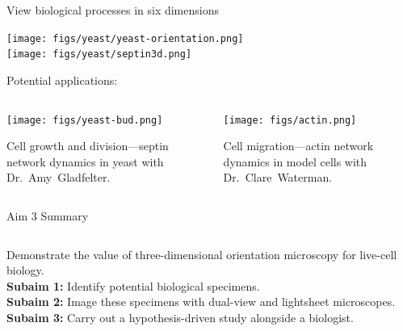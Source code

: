 \documentclass[presentation]{beamer}
\begin{document}
\begin{frame}{View biological processes in six dimensions}
  \begin{center}
    \texttt{[image: figs/yeast/yeast-orientation.png]}\\
    \texttt{[image: figs/yeast/septin3d.png]}
 \end{center}
\end{frame}

\begin{frame}{Potential applications:}
  \begin{columns}
    \begin{column}{0.5\textwidth}
      \begin{center}
      \texttt{[image: figs/yeast-bud.png]}\\  
      \end{center}
      Cell growth and division---septin network dynamics in yeast with Dr.~Amy~Gladfelter. 
    \end{column}
    \begin{column}{0.5\textwidth}
      \begin{center}
      \texttt{[image: figs/actin.png]}\\  
      \end{center}
      Cell migration---actin network dynamics in model cells with Dr.~Clare~Waterman.
    \end{column}
\end{columns}
\end{frame}

\begin{frame}{Aim 3 Summary}
  \begin{columns}
    \begin{column}{0.75\textwidth}
    Demonstrate the value of three-dimensional
    orientation microscopy for live-cell biology.\\ \vspace{1em}
    \textbf{Subaim 1:} 
    Identify potential biological specimens. \\ \vspace{1em}
    \textbf{Subaim 2:}
    Image these specimens with dual-view and lightsheet microscopes.\\ \vspace{1em}
    \textbf{Subaim 3:}
    Carry out a hypothesis-driven study alongside a biologist.
    \end{column}
  \end{columns}
  \end{frame}
\end{document}

